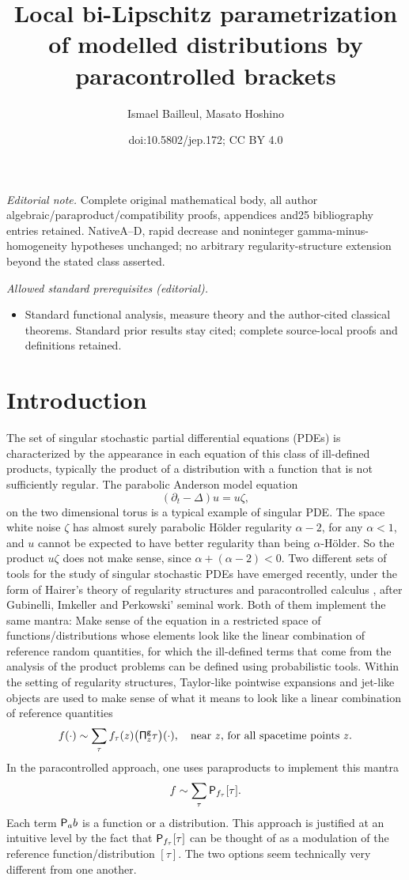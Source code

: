 \documentclass[10pt]{amsart}
\title{Local bi-Lipschitz parametrization of modelled distributions by paracontrolled brackets}
\author{Ismael Bailleul, Masato Hoshino}
\date{doi:10.5802/jep.172; CC BY 4.0}
\theoremstyle{plain}
\theoremstyle{definition}
\begin{document}
\maketitle
\noindent\textit{Editorial note.} Complete original mathematical body, all author algebraic/paraproduct/compatibility proofs, appendices and25 bibliography entries retained. NativeA–D, rapid decrease and noninteger gamma-minus-homogeneity hypotheses unchanged; no arbitrary regularity-structure extension beyond the stated class asserted.\par\medskip
\noindent\textit{Allowed standard prerequisites (editorial).}\begin{itemize}
\item Standard functional analysis, measure theory and the author-cited classical theorems. Standard prior results stay cited; complete source-local proofs and definitions retained.
\end{itemize}\medskip
\tableofcontents


\section{Introduction}
\label{SectionIntro}

The set of singular stochastic partial differential equations (PDEs) is characterized by the appearance in each equation of this class of ill-defined products, typically the product of a distribution with a function that is not sufficiently regular. The parabolic Anderson model equation
\[
(\partial_t-\Delta) u = u\zeta,
\]
on the two dimensional torus is a typical example of singular PDE. The space white noise $\zeta$ has almost surely parabolic Hölder regularity $\alpha-2$, for any $\alpha<1$, and $u$ cannot be expected to have better regularity than being $\alpha$-Hölder. So the product $u\zeta$ does not make sense, since $\alpha+(\alpha-2)<0$. Two different sets of tools for the study of singular stochastic PDEs have emerged recently, under the form of Hairer's theory of regularity structures \cite{Hai, BHZ, CH16, BCCH18} and paracontrolled calculus \cite{GIP, BBF15, BB16}, after Gubinelli, Imkeller and Perkowski' seminal work. Both of them implement the same mantra: Make sense of the equation in a restricted space of functions/distributions whose elements look like the linear combination of reference random quantities, for which the ill-defined terms that come from the analysis of the product problems can be defined using probabilistic tools. Within the setting of regularity structures, Taylor-like pointwise expansions and jet-like objects are used to make sense of what it means to look like a linear combination of reference quantities
\[
f (\cdot) \sim \sum_\tau f_\tau(z)\bigl({\sf \Pi}^{\sf g}_z\tau\bigr)(\cdot), \quad \textrm{near $z$, for all spacetime points $z$}.
\]
In the paracontrolled approach, one uses paraproducts to implement this mantra
\[
f \sim \sum_\tau {\sf P}_{f_\tau}[\tau].
\]
Each term ${\sf P}_ab$ is a function or a distribution. This approach is justified at an intuitive level by the fact that ${\sf P}_{f_\tau}[\tau]$ can be thought of as a modulation of the reference function/distribution $[\tau]$. The two options seem technically very different from one another.
\end{document}
